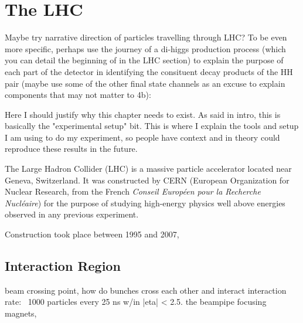 \chapter{The LHC}\label{chapter:lhc}

Maybe try narrative direction of particles travelling through LHC?
To be even more specific, perhaps use the journey of a di-higgs production process
(which you can detail the beginning of in the LHC section)
to explain the purpose of each part of the detector in identifying the consituent decay products of the HH pair
(maybe use some of the other final state channels as an excuse to explain components that may not matter to 4b):




Here I should justify why this chapter needs to exist. As said in intro, this is basically the "experimental setup" bit. This is where I explain the tools and setup I am using to do my experiment, so people have context and in theory could reproduce these results in the future.






The Large Hadron Collider (LHC) is a massive particle accelerator located near Geneva, Switzerland.
It was constructed by CERN (European Organization for Nuclear Research, from the French \textit{Conseil Européen pour la Recherche Nucléaire}) for the purpose of studying high-energy physics well above energies observed in any previous experiment.

Construction took place between 1995 and 2007, 





\section{Interaction Region} %
    beam crossing point,
    how do bunches cross each other and interact
    interaction rate: ~1000 particles every 25 ns w/in |eta| < 2.5.
    the beampipe focusing magnets,



